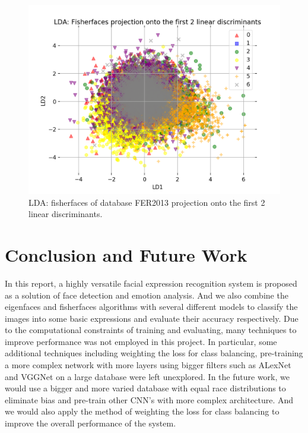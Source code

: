 \documentclass[10pt,twocolumn,letterpaper]{article}
\begin{document}
\begin{figure}[t]
\begin{center}
  \includegraphics[width=0.8\linewidth]{Feature Extraction Images/fer2013_lda_projection.png}
  \caption{LDA: fisherfaces of database FER2013 projection onto the first 2 linear discriminants. \cite{Article06}}
  \label{fig:fer_lda_proj}
\end{center}
\end{figure}

\section{Conclusion and Future Work}

In this report, a highly versatile facial expression recognition system is proposed as a solution of face detection and emotion analysis. And we also combine the eigenfaces and fisherfaces algorithms with several different models to classify the images into some basic expressions and evaluate their accuracy respectively. Due to the computational constraints of training and evaluating, many techniques to improve performance was not employed in this project. In particular, some additional techniques including weighting the loss for class balancing, pre-training a more complex network with more layers using bigger filters such as ALexNet and VGGNet on a large database were left unexplored. In the future work, we would use a bigger and more varied database with equal race distributions to eliminate bias and pre-train other CNN's with more complex architecture. And we would also apply the method of weighting the loss for class balancing to improve the overall performance of the system.
\end{document}
